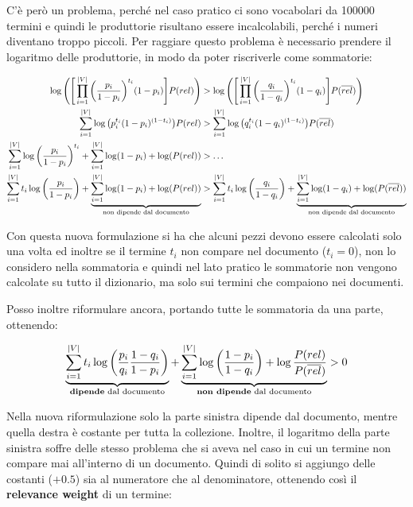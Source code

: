 C'è però un problema, perché nel caso pratico ci sono vocabolari da 100000 termini e quindi le produttorie risultano essere incalcolabili, perché i numeri diventano troppo piccoli.
Per raggiare questo problema è necessario prendere il logaritmo delle produttorie, in modo da poter riscriverle come sommatorie:

\begin{align*}
\log \Bigg(\Bigg[\prod\limits_{i=1}^{|V|} \bigg(\frac{ p_{i} }{1-p_i}\bigg)^{t_i} (1-p_i)\Bigg] P(rel)\Bigg) &>\log\Bigg(\Bigg[\prod\limits_{i=1}^{|V|} \bigg(\frac{ q_{i} }{1-q_i}\bigg)^{t_i} (1-q_i)\Bigg] P(\overline{rel})\Bigg) \\
\sum\limits_{i=1}^{|V|} \log\big( p_{i}^{t_i} (1 - p_{i})^{(1-t_i)} \big) P(rel) &> \sum\limits_{i=1}^{|V|} \log\big( q_{i}^{t_i} (1 - q_{i})^{(1-t_i)} \big) P(\overline{rel}) \\
\sum\limits_{i=1}^{|V|} \log\bigg( \frac{ p_{i} }{1-p_i} \bigg)^{t_i} +\sum\limits_{i=1}^{|V|} \log(1-p_i) + \log(P(rel)) &> \ldots \\
\sum\limits_{i=1}^{|V|} t_i \log\bigg( \frac{ p_{i} }{1-p_i} \bigg) + \underbrace{\sum\limits_{i=1}^{|V|} \log(1-p_i) + \log(P(rel))}_{\text{non dipende dal documento}} &> \sum\limits_{i=1}^{|V|} t_i \log\bigg( \frac{ q_{i} }{1-q_i} \bigg) +\underbrace{\sum\limits_{i=1}^{|V|} \log(1-q_i) + \log(P(\overline{rel}))}_{\text{non dipende dal documento}}
\end{align*}

\noindent Con questa nuova formulazione si ha che alcuni pezzi devono essere calcolati solo una volta ed inoltre se il termine $t_i$ non compare nel documento ($t_i=0$), non lo considero nella sommatoria e quindi nel lato pratico le sommatorie non vengono calcolate su tutto il dizionario, ma solo sui termini che compaiono nei documenti.

Posso inoltre riformulare ancora, portando tutte le sommatoria da una parte, ottenendo:

$$
\underbrace{\sum\limits_{i=1}^{|V|} t_i \log\bigg( \frac{p_i}{q_i} \frac{1-q_i}{1-p_i}\bigg)}_{\text{\textbf{dipende} dal documento}} + \underbrace{\sum\limits_{i=1}^{|V|} \log \bigg( \frac{1-p_i}{1-q_i} \bigg) + \log \frac{P(rel)}{P(\overline{rel})}}_{\text{\textbf{non dipende} dal documento}} > 0
$$

\noindent Nella nuova riformulazione solo la parte sinistra dipende dal documento, mentre quella destra è costante per tutta la collezione.
Inoltre, il logaritmo della parte sinistra soffre delle stesso problema che si aveva nel caso in cui un termine non compare mai all'interno di un documento.
Quindi di solito si aggiungo delle costanti ($+0.5$) sia al numeratore che al denominatore, ottenendo così il \textbf{relevance weight} di un termine:

